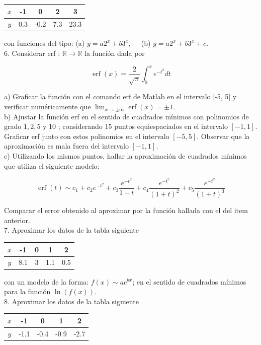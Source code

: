 \documentclass[10pt]{book}
\begin{document}
\begin{center}
\begin{tabular}{|c|c|c|c|c|}
\hline
$x$ & -1 & 0 & 2 & 3 \\
\hline
$y$ & 0.3 & -0.2 & 7.3 & 23.3 \\
\hline
\end{tabular}
\end{center}

con funciones del tipo: (a) $y=a 2^{x}+b 3^{x}, \quad$ (b) $y=a 2^{x}+b 3^{x}+c$.\\
6. Considerar erf : $\mathbb{R} \rightarrow \mathbb{R}$ la función dada por

$$
\operatorname{erf}(x)=\frac{2}{\sqrt{\pi}} \int_{0}^{x} e^{-t^{2}} d t
$$

a) Graficar la función con el comando erf de Matlab en el intervalo [-5, 5] y verificar numéricamente que $\lim _{x \rightarrow \pm \infty} \operatorname{erf}(x)= \pm 1$.\\
b) Ajustar la función erf en el sentido de cuadrados mínimos con polinomios de grado $1,2,5$ y 10 ; considerando 15 puntos equiespaciados en el intervalo $[-1,1]$. Graficar erf junto con estos polinomios en el intervalo $[-5,5]$. Observar que la aproximación es mala fuera del intervalo $[-1,1]$.\\
c) Utilizando los mismos puntos, hallar la aproximación de cuadrados mínimos que utiliza el siguiente modelo:

$$
\operatorname{erf}(t) \sim c_{1}+c_{2} e^{-t^{2}}+c_{3} \frac{e^{-t^{2}}}{1+t}+c_{4} \frac{e^{-t^{2}}}{(1+t)^{2}}+c_{5} \frac{e^{-t^{2}}}{(1+t)^{3}}
$$

Comparar el error obtenido al aproximar por la función hallada con el del item anterior.\\
7. Aproximar los datos de la tabla siguiente

\begin{center}
\begin{tabular}{|c|c|c|c|c|}
\hline
$x$ & -1 & 0 & 1 & 2 \\
\hline
$y$ & 8.1 & 3 & 1.1 & 0.5 \\
\hline
\end{tabular}
\end{center}

con un modelo de la forma: $f(x) \sim a e^{b x}$; en el sentido de cuadrados mínimos para la función $\ln (f(x))$.\\
8. Aproximar los datos de la tabla siguiente

\begin{center}
\begin{tabular}{|c|c|c|c|c|}
\hline
$x$ & -1 & 0 & 1 & 2 \\
\hline
$y$ & -1.1 & -0.4 & -0.9 & -2.7 \\
\hline
\end{tabular}
\end{center}
\end{document}
